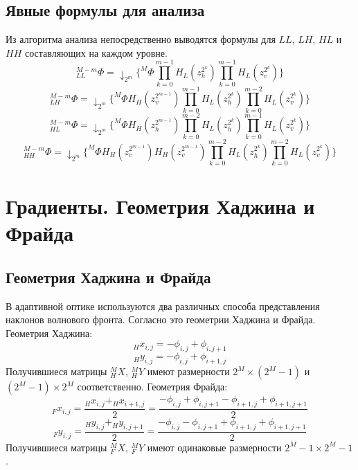 \documentclass[oneside, final, 14pt]{article}
\begin{document}
\subsection{Явные формулы для анализа}
Из алгоритма анализа непосредственно выводятся формулы для $LL$, $LH$, $HL$ и $HH$ составляющих на каждом уровне.
\begin{equation}\label{LL}
_{LL}^{M-m}\Phi=
\downarrow_{2^m} \{^M\Phi\prod\limits_{k = 0}^{m-1} H_L(z_h^{2^k})
							\prod\limits_{k = 0}^{m-1} H_L(z_v^{2^k})\}
\end{equation}
\begin{equation}\label{LH}
_{LH}^{M-m}\Phi=
\downarrow_{2^m} \{^M\Phi H_H(z_v^{2^{m-1}}) \prod\limits_{k = 0}^{m-1} H_L(z_h^{2^k})
							\prod\limits_{k = 0}^{m-2} H_L(z_v^{2^k})\}
\end{equation}
\begin{equation}\label{HL}
_{HL}^{M-m}\Phi=\downarrow_{2^m} \{^M\Phi H_H(z_h^{2^{m-1}}) \prod\limits_{k = 0}^{m-2} H_L(z_h^{2^k})
						\prod\limits_{k = 0}^{m-1} H_L(z_v^{2^k})\}
\end{equation}
\begin{equation}\label{HH}
_{HH}^{M-m}\Phi=\downarrow_{2^m} \{^M\Phi H_H(z_v^{2^{m-1}}) H_H(z_v^{2^{m-1}}) \prod\limits_{k = 0}^{m-2} H_L(z_h^{2^k})
							\prod\limits_{k = 0}^{m-2} H_L(z_v^{2^k})\}
\end{equation}
\newpage
\section{Градиенты. Геометрия Хаджина и Фрайда}
\subsection{Геометрия Хаджина и Фрайда}
В адаптивной оптике используются два различных способа представления наклонов волнового фронта. Согласно \cite{how}
это геометрии Хаджина и Фрайда.
Геометрия Хаджина:
$$_{H}x_{i,j}=-\phi_{i,j}+\phi_{i,j+1}$$
$$_{H}y_{i,j}=-\phi_{i,j}+\phi_{i+1,j}$$
Получившиеся матрицы $_H^{M}X$, $_H^{M}Y$ имеют размерности $2^M \times(2^M - 1)$ и $(2^M - 1) \times 2^M$ соответственно.
Геометрия Фрайда:
$$_{F}x_{i,j}=\frac{_{H}x_{i,j} + _{H}x_{i+1,j}}{2} = \frac{-\phi_{i,j}+\phi_{i,j+1}-\phi_{i+1,j}+\phi_{i+1,j+1}}{2}$$
$$_{F}y_{i,j}=\frac{_{H}y_{i,j} + _{H}y_{i,j+1}}{2} = \frac{-\phi_{i,j}-\phi_{i,j+1}+\phi_{i+1,j}+\phi_{i+1,j+1}}{2}$$
Получившиеся матрицы $_F^{M}X$, $_F^{M}Y$ имеют одинаковые размерности $2^M - 1 \times 2^M - 1$.
\end{document}

